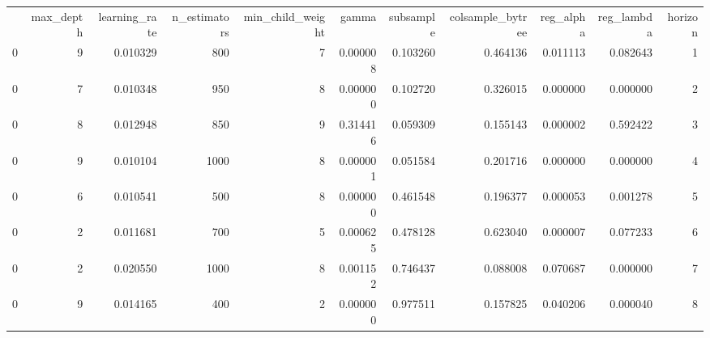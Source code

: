 \begin{tabular}{lrrrrrrrrrr}
 & max_depth & learning_rate & n_estimators & min_child_weight & gamma & subsample & colsample_bytree & reg_alpha & reg_lambda & horizon \\
0 & 9 & 0.010329 & 800 & 7 & 0.000008 & 0.103260 & 0.464136 & 0.011113 & 0.082643 & 1 \\
0 & 7 & 0.010348 & 950 & 8 & 0.000000 & 0.102720 & 0.326015 & 0.000000 & 0.000000 & 2 \\
0 & 8 & 0.012948 & 850 & 9 & 0.314416 & 0.059309 & 0.155143 & 0.000002 & 0.592422 & 3 \\
0 & 9 & 0.010104 & 1000 & 8 & 0.000001 & 0.051584 & 0.201716 & 0.000000 & 0.000000 & 4 \\
0 & 6 & 0.010541 & 500 & 8 & 0.000000 & 0.461548 & 0.196377 & 0.000053 & 0.001278 & 5 \\
0 & 2 & 0.011681 & 700 & 5 & 0.000625 & 0.478128 & 0.623040 & 0.000007 & 0.077233 & 6 \\
0 & 2 & 0.020550 & 1000 & 8 & 0.001152 & 0.746437 & 0.088008 & 0.070687 & 0.000000 & 7 \\
0 & 9 & 0.014165 & 400 & 2 & 0.000000 & 0.977511 & 0.157825 & 0.040206 & 0.000040 & 8 \\
\end{tabular}
